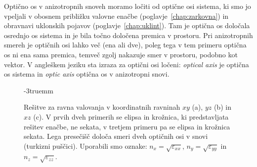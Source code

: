 \begin{remark}
Optično os v anizotropnih snoveh moramo ločiti od optične osi sistema, ki smo jo vpeljali v obosnem
približku valovne enačbe (poglavje~\ref{chap:zarkovna}) in obravnavi uklonskih pojavov 
(poglavje~\ref{chap:uklint}). Tam je optična os določala osrednjo os sistema in je bila točno določena 
premica v prostoru. Pri anizotropnih smereh je optičnih osi lahko več (ena ali dve), poleg tega
 v tem primeru optična os ni ena sama premica, temveč zgolj nakazuje smer v prostoru, podobno kot vektor. 
V angleškem jeziku sta izraza za optični osi ločeni: {\it optical axis} je optična os sistema 
in {\it optic axis} optična os v anizotropni snovi.
\end{remark}

\begin{figure}[ht]
\centering
\def\svgwidth{140truemm} 

\caption{Rešitve za ravna valovanja v koordinatnih ravninah $xy$ (a), $yz$ (b) in $xz$ (c).
V prvih dveh primerih se elipsa in krožnica, ki predstavljata rešitev enačbe, ne sekata, v tretjem
primeru pa se elipsa in krožnica sekata. Lega presečišč določa smeri dveh optičnih osi v snovi (turkizni puščici).
Uporabili smo oznake: $n_x = \sqrt{\varepsilon_{xx}}$, $n_y = \sqrt{\varepsilon_{yy}}$ in $n_z = \sqrt{\varepsilon_{zz}}$.}
\label{fig:10_ploskev_preseki}
\vglue-3truemm
\end{figure}

